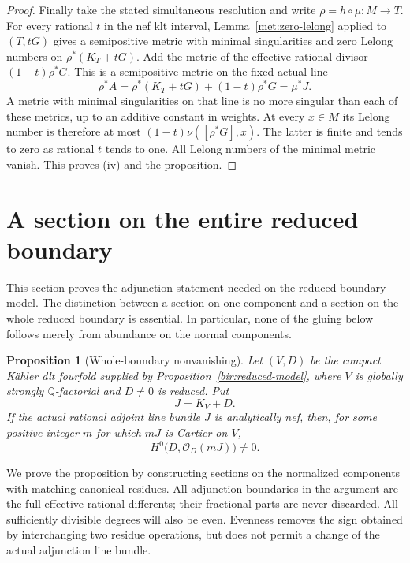 \documentclass[11pt,letterpaper]{article}
\newtheorem{proposition}[theorem]{Proposition}
\theoremstyle{definition}
\theoremstyle{remark}
\begin{document}
\begin{proof}
Finally take the stated simultaneous resolution and write
$\rho=h\circ\mu:M\to T$.  For every rational $t$ in the nef klt
interval, Lemma~\ref{met:zero-lelong} applied to
$(T,tG)$ gives a semipositive metric with minimal singularities
and zero Lelong numbers on $\rho^*(K_T+tG)$.  Add the metric of
the effective rational divisor $(1-t)\rho^*G$.  This is a
semipositive metric on the fixed actual line
\begin{equation}
 \rho^*A=\rho^*(K_T+tG)+(1-t)\rho^*G=\mu^*J.
 \label{bir:metric-interval}
\end{equation}
A metric with minimal singularities on that line is no more
singular than each of these metrics, up to an additive constant
in weights.  At every $x\in M$ its Lelong number is therefore at
most $(1-t)\nu([\rho^*G],x)$.  The latter is finite and tends to
zero as rational $t$ tends to one.  All Lelong numbers of the
minimal metric vanish.  This proves (iv) and the proposition.
\end{proof}

\section{A section on the entire reduced boundary}
\label{floor:sec}

This section proves the adjunction statement needed on the reduced-boundary
model.  The distinction between a section on one component and a section on
the whole reduced boundary is essential.  In particular, none of the gluing
below follows merely from abundance on the normal components.

\begin{proposition}[Whole-boundary nonvanishing]
\label{floor:section}
Let $(V,D)$ be the compact K\"ahler dlt fourfold supplied by
Proposition~\ref{bir:reduced-model}, where $V$ is globally strongly
$\mathbb{Q}$-factorial and $D\ne0$ is reduced.  Put
\[
 J=K_V+D.
\]
If the actual rational adjoint line bundle $J$ is analytically nef, then,
for some positive integer $m$ for which $mJ$ is Cartier on $V$,
\begin{equation}
 \label{floor:goal}
 H^0\bigl(D,\mathcal{O}_D(mJ)\bigr)\ne0.
\end{equation}
\end{proposition}

We prove the proposition by constructing sections on the normalized
components with matching canonical residues.  All adjunction boundaries
in the argument are the full effective rational differents; their
fractional parts are never discarded.  All sufficiently divisible degrees
will also be even.  Evenness removes the sign obtained by interchanging
two residue operations, but does not permit a change of the actual
adjunction line bundle.
\end{document}
